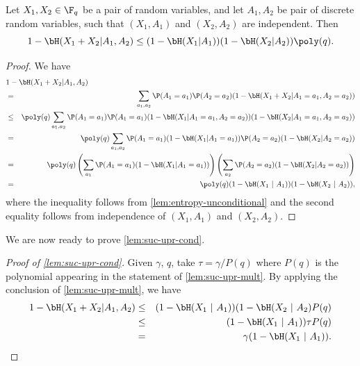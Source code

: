 \documentclass[11pt]{article}
\begin{document}
\begin{lemma}
	\label{lem:suc-upr-mult}
	Let $X_1, X_2 \in \F_q$ be a pair of random variables, and let $A_1, A_2$ be pair of discrete random variables, such that $(X_1, A_1)$ and $(X_2, A_2)$ are independent. Then
	\begin{equation*}
		1 - \bH(X_1 + X_2 | A_1, A_2) \leq (1 - \bH(X_1 | A_1))(1 - \bH(X_2 | A_2)) \poly(q).
		\label{}
	\end{equation*}
\end{lemma}
\begin{proof}
	We have
	\begin{eqnarray*}
		\lefteqn{1 - \bH(X_1 + X_2 | A_1, A_2)}\\
		&=&  \sum_{a_1, a_2} \P(A_1 = a_1) \P(A_2 = a_2) (1 - \bH(X_1 + X_2|A_1 = a_1, A_2= a_2))  \\
		&\leq& \poly(q) \sum_{a_1, a_2} \P(A_1 = a_1) \P(A_1 = a_1) (1 - \bH(X_1 | A_1 = a_1, A_2 = a_2))(1 - \bH(X_2 | A_1 = a_1, A_2 = a_2)) \\
		& =& \poly(q) \sum_{a_1, a_2} \P(A_1 = a_1) (1 - \bH(X_1 | A_1 = a_1)) \P(A_2 = a_2) (1 - \bH(X_2 | A_2 = a_2)) \\
		& =& \poly(q) \left(\sum_{a_1} \P(A_1 = a_1) (1 - \bH(X_1 | A_1 = a_1))\right)\left(\sum_{a_2} \P(A_2 = a_2) (1 - \bH(X_2 | A_2 = a_2))\right) \\
		& =& \poly(q) (1 - \bH(X_1~|~A_1)) (1 - \bH(X_2~|~A_2)),
		\label{}
	\end{eqnarray*}
	where the inequality follows from \cref{lem:entropy-unconditional} and the second equality follows from independence of $(X_1,A_1)$ and $(X_2,A_2)$.
\end{proof}

We are now ready to prove \cref{lem:suc-upr-cond}.

\begin{proof}[Proof of \cref{lem:suc-upr-cond}]
	Given $\gamma$, $q$, take $\tau = \gamma/P(q)$ where $P(q)$ is the polynomial appearing in the statement of \cref{lem:suc-upr-mult}. By applying the conclusion of \cref{lem:suc-upr-mult}, we have
	\begin{eqnarray*}
		1 - \bH(X_1 + X_2 | A_1, A_2)
		& \leq & (1 - \bH(X_1 ~|~ A_1))(1 - \bH(X_2 ~|~ A_2) P(q) \\
		& \leq & (1 - \bH(X_1 ~|~ A_1)) \tau P(q) \\
		& = & \gamma (1 - \bH(X_1 ~|~ A_1)). \qedhere
	\end{eqnarray*}
\end{proof}
\end{document}
